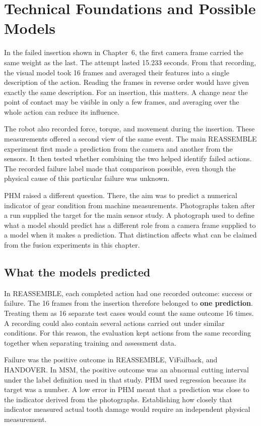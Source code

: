 \chapter{Technical Foundations and Possible Models}
\label{ch:foundations}

In the failed insertion shown in Chapter~6, the first camera frame carried the same weight as the last. The attempt lasted 15.233 seconds. From that recording, the visual model took 16 frames and averaged their features into a single description of the action. Reading the frames in reverse order would have given exactly the same description. For an insertion, this matters. A change near the point of contact may be visible in only a few frames, and averaging over the whole action can reduce its influence.

The robot also recorded force, torque, and movement during the insertion. These measurements offered a second view of the same event. The main REASSEMBLE experiment first made a prediction from the camera and another from the sensors. It then tested whether combining the two helped identify failed actions. The recorded failure label made that comparison possible, even though the physical cause of this particular failure was unknown.

PHM raised a different question. There, the aim was to predict a numerical indicator of gear condition from machine measurements. Photographs taken after a run supplied the target for the main sensor study. A photograph used to define what a model should predict has a different role from a camera frame supplied to a model when it makes a prediction. That distinction affects what can be claimed from the fusion experiments in this chapter.

\section{What the models predicted}

In REASSEMBLE, each completed action had one recorded outcome: success or failure. The 16 frames from the insertion therefore belonged to \textbf{one prediction}. Treating them as 16 separate test cases would count the same outcome 16 times. A recording could also contain several actions carried out under similar conditions. For this reason, the evaluation kept actions from the same recording together when separating training and assessment data.

Failure was the positive outcome in REASSEMBLE, ViFailback, and HANDOVER. In MSM, the positive outcome was an abnormal cutting interval under the label definition used in that study. PHM used regression because its target was a number. A low error in PHM meant that a prediction was close to the indicator derived from the photographs. Establishing how closely that indicator measured actual tooth damage would require an independent physical measurement.

